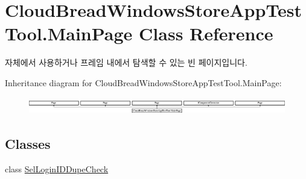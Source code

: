 \hypertarget{class_cloud_bread_windows_store_app_test_tool_1_1_main_page}{}\section{Cloud\+Bread\+Windows\+Store\+App\+Test\+Tool.\+Main\+Page Class Reference}
\label{class_cloud_bread_windows_store_app_test_tool_1_1_main_page}


자체에서 사용하거나 프레임 내에서 탐색할 수 있는 빈 페이지입니다.  


Inheritance diagram for Cloud\+Bread\+Windows\+Store\+App\+Test\+Tool.\+Main\+Page\+:\begin{figure}[H]
\begin{center}
\leavevmode
\includegraphics[height=0.751678cm]{class_cloud_bread_windows_store_app_test_tool_1_1_main_page}
\end{center}
\end{figure}
\subsection*{Classes}
\begin{DoxyCompactItemize}
\item 
class \hyperlink{class_cloud_bread_windows_store_app_test_tool_1_1_main_page_1_1_sel_login_i_d_dupe_check}{Sel\+Login\+I\+D\+Dupe\+Check}
\end{DoxyCompactItemize}
